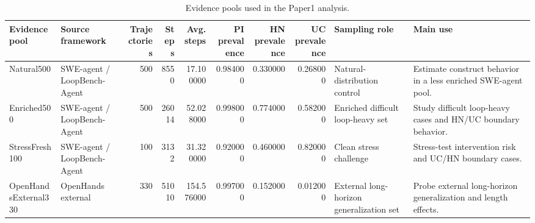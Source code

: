 \begin{table}
\caption{Evidence pools used in the Paper1 analysis.}
\label{tab:table1_evidence_pools}
\begin{tabular}{llrrrrrrll}
\toprule
Evidence pool & Source framework & Trajectories & Steps & Avg. steps & PI prevalence & HN prevalence & UC prevalence & Sampling role & Main use \\
\midrule
Natural500 & SWE-agent / LoopBench-Agent & 500 & 8550 & 17.100000 & 0.984000 & 0.330000 & 0.268000 & Natural-distribution control & Estimate construct behavior in a less enriched SWE-agent pool. \\
Enriched500 & SWE-agent / LoopBench-Agent & 500 & 26014 & 52.028000 & 0.998000 & 0.774000 & 0.582000 & Enriched difficult loop-heavy set & Study difficult loop-heavy cases and HN/UC boundary behavior. \\
StressFresh100 & SWE-agent / LoopBench-Agent & 100 & 3132 & 31.320000 & 0.920000 & 0.460000 & 0.820000 & Clean stress challenge & Stress-test intervention risk and UC/HN boundary cases. \\
OpenHandsExternal330 & OpenHands external & 330 & 51010 & 154.576000 & 0.997000 & 0.152000 & 0.012000 & External long-horizon generalization set & Probe external long-horizon generalization and length effects. \\
\bottomrule
\end{tabular}
\end{table}

